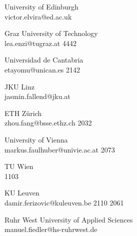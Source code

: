 \begin{multicols}{2}
 {University of Edinburgh\\}%
 {victor.elvira@ed.ac.uk}%
 {} %
 {} %
 {} %
 {} %
 {} %

 {Graz University of Technology\\}%
 {lea.enzi@tugraz.at}%
 {4442} %
 {} %
 {} %
 {} %
 {} %

 {Universidad de Cantabria\\}%
 {etayomu@unican.es}%
 {2142} %
 {} %
 {} %
 {} %
 {} %


 {JKU Linz\\}%
 {jasmin.fallend@jku.at}%
 {} %
 {} %
 {} %
 {} %
 {} %

 {ETH Z\"{u}rich\\}%
 {zhou.fang@bsse.ethz.ch}%
 {2032} %
 {} %
 {} %
 {} %
 {} %

 {University of Vienna\\}%
 {markus.faulhuber@univie.ac.at}%
 {2073} %
 {} %
 {} %
 {} %
 {} %

 {TU Wien\\}%
 {1103}%
 {} %
 {} %
 {} %
 {} %
 {} %

 {KU Leuven\\}%
 {damir.ferizovic@kuleuven.be}%
 {2110} %
 {2061} %
 {} %
 {} %
 {} %

 {Ruhr West University of Applied Sciences\\}%
 {manuel.fiedler@hs-ruhrwest.de}%
 {} %
 {} %
 {} %
 {} %
 {} %


\end{multicols}
